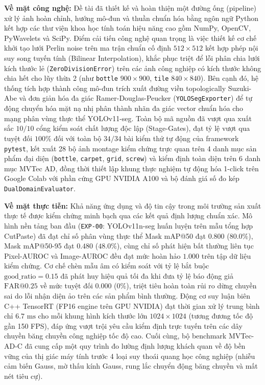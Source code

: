 \textbf{Về mặt công nghệ:} Đề tài đã thiết kế và hoàn thiện một đường ống (pipeline) xử lý ảnh hoàn chỉnh, hướng mô-đun và thuần chuẩn hóa bằng ngôn ngữ Python kết hợp các thư viện khoa học tính toán hiệu năng cao gồm NumPy, OpenCV, PyWavelets và SciPy. Điểm cải tiến công nghệ quan trọng là việc thiết kế cơ chế khởi tạo lưới Perlin noise trên ma trận chuẩn cố định $512 \times 512$ kết hợp phép nội suy song tuyến tính (Bilinear Interpolation), khắc phục triệt để lỗi phân chia lưới kích thước lẻ (\texttt{ZeroDivisionError}) trên các ảnh công nghiệp có kích thước không chia hết cho lũy thừa 2 (như \texttt{bottle} $900 \times 900$, \texttt{tile} $840 \times 840$). Bên cạnh đó, hệ thống tích hợp thành công mô-đun trích xuất đường viền topologically Suzuki-Abe và đơn giản hóa đa giác Ramer-Douglas-Peucker (\texttt{YOLOSegExporter}) để tự động chuyển hóa mặt nạ nhị phân thành nhãn đa giác vector chuẩn hóa cho mạng phân vùng thực thể YOLOv11-seg. Toàn bộ mã nguồn đã vượt qua xuất sắc $10/10$ cổng kiểm soát chất lượng độc lập (Stage-Gates), đạt tỷ lệ vượt qua tuyệt đối $100\%$ đối với toàn bộ $34/34$ bài kiểm thử tự động của framework \texttt{pytest}, kết xuất 28 bộ ảnh montage kiểm chứng trực quan trên 4 danh mục sản phẩm đại diện (\texttt{bottle}, \texttt{carpet}, \texttt{grid}, \texttt{screw}) và kiểm định toàn diện trên 6 danh mục MVTec AD, đồng thời thiết lập khung thực nghiệm tự động hóa 1-click trên Google Colab với phần cứng GPU NVIDIA A100 và bộ đánh giá số đo kép \texttt{DualDomainEvaluator}.

\textbf{Về mặt thực tiễn:} Khả năng ứng dụng và độ tin cậy trong môi trường sản xuất thực tế được kiểm chứng minh bạch qua các kết quả định lượng chuẩn xác. Mô hình nền tảng ban đầu (\texttt{EXP-00}: YOLOv11n-seg huấn luyện trên mẫu tổng hợp CutPaste) đã đạt chỉ số phân vùng thực thể Mask mAP@50 đạt $0.800$ ($80.0\%$), Mask mAP@50-95 đạt $0.480$ ($48.0\%$), cùng chỉ số phát hiện bất thường liên tục Pixel-AUROC và Image-AUROC đều đạt mức hoàn hảo $1.000$ trên tập dữ liệu kiểm chứng. Cơ chế chèn mẫu âm có kiểm soát với tỷ lệ bắt buộc $\text{good\_ratio} = 0.15$ đã phát huy hiệu quả tối đa khi đưa tỷ lệ báo động giả $\text{FAR@0.25}$ về mức tuyệt đối $0.000$ ($0\%$), triệt tiêu hoàn toàn rủi ro dừng chuyền sai do lỗi nhận diện ảo trên các sản phẩm bình thường. Động cơ suy luận biên C++ TensorRT (FP16 engine trên GPU NVIDIA) đạt thời gian xử lý trung bình chỉ $6.7\text{ ms}$ cho mỗi khung hình kích thước lớn $1024 \times 1024$ (tương đương tốc độ gần 150 FPS), đáp ứng vượt trội yêu cầu kiểm định trực tuyến trên các dây chuyền băng chuyền công nghiệp tốc độ cao. Cuối cùng, bộ benchmark MVTec-AD-C đã cung cấp một quy trình đo lường định lượng khách quan về độ bền vững của thị giác máy tính trước 4 loại suy thoái quang học công nghiệp (nhiễu cảm biến Gauss, mờ thấu kính Gauss, rung lắc chuyển động băng chuyền và mất nét tiêu cự).


